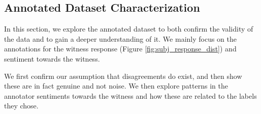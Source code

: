 \subsection{Annotated Dataset Characterization}
In this section, we explore the annotated dataset to both confirm the validity of the data and to gain a deeper understanding of it. We mainly focus on the annotations for the witness response (Figure \ref{fig:subj_response_dist}) and sentiment towards the witness.

We first confirm our assumption that disagreements do exist, and then show these are in fact genuine and not noise. We then explore patterns in the annotator sentiments towards the witness and how these are related to the labels they chose. 


